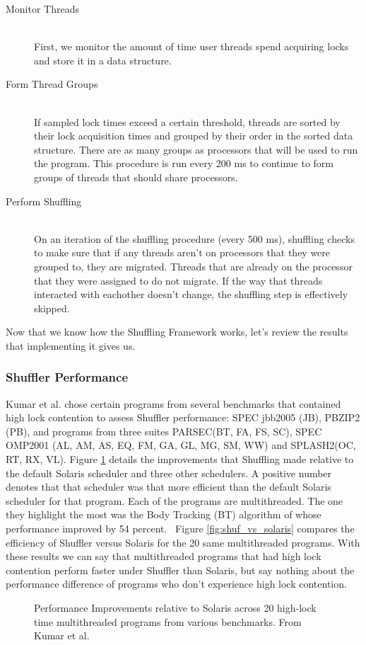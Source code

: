 \documentclass{sig-alternate}
\begin{document}
\begin{description}
\item [Monitor Threads] \ \\
First, we monitor the amount of time user threads spend acquiring locks and store it in a data structure. 

\item [Form Thread Groups] \ \\
If sampled lock times exceed a certain threshold, threads are sorted by their lock acquisition times and grouped by their order in the sorted data structure. There are as many groups as processors that will be used to run the program. This procedure is run every 200 ms to continue to form groups of threads that should share processors.

\item [Perform Shuffling] \ \\
On an iteration of the shuffling procedure (every 500 ms), shuffling checks to make sure that if any threads aren't on processors that they were grouped to, they are migrated. Threads that are already on the processor that they were assigned to do not migrate. If the way that threads interacted with eachother doesn't change, the shuffling step is effectively skipped.~\cite{Kumar:2014}
\end{description}

Now that we know how the Shuffling Framework works, let's review the results that implementing it gives us.

\subsubsection{Shuffler Performance}
\label{sec:shuf_performance}

Kumar et al. chose certain programs from several benchmarks that contained high lock contention to assess Shuffler performance: SPEC jbb2005 (JB), PBZIP2 (PB), and programs from three suites PARSEC(BT, FA, FS, SC), SPEC OMP2001 (AL, AM, AS, EQ, FM, GA, GL, MG, SM, WW) and SPLASH2(OC, RT, RX, VL). Figure \ref{fig:shuf_performance} details the improvements that Shuffling made relative to the default Solaris scheduler and three other schedulers. A positive number denotes that that scheduler was that more efficient than the default Solaris scheduler for that program. Each of the programs are multithreaded. The one they highlight the most was the Body Tracking (BT) algorithm of whose performance improved by 54 percent.~\cite{Kumar:2014} Figure \ref{fig:shuf_vs_solaris} compares the efficiency of Shuffler versus Solaris for the 20 same multithreaded programs. With these results we can say that multithreaded programs that had high lock contention perform faster under Shuffler than Solaris, but say nothing about the performance difference of programs who don't experience high lock contention.
\begin{figure}
\centering
{}
\caption{Performance Improvements relative to Solaris across 20 high-lock time multithreaded programs from various benchmarks. From Kumar et al.~\cite{Kumar:2014}}
\label{fig:shuf_performance}
\end{figure}
\end{document}

